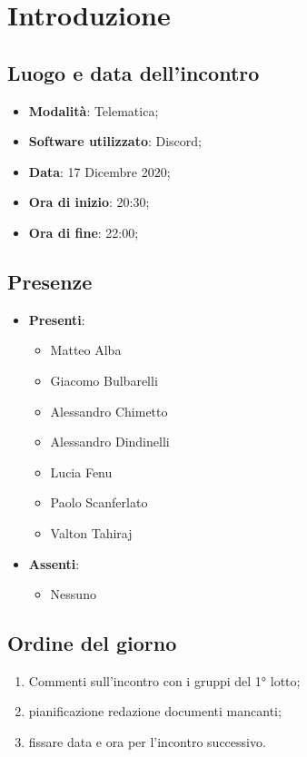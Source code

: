 \documentclass[]{article}
\begin{document}
	

	\newpage


	\section{Introduzione}
		\subsection{Luogo e data dell'incontro}
		\begin{itemize}
			\item \textbf{Modalità}: Telematica;
			\item \textbf{Software utilizzato}: Discord;
			\item \textbf{Data}: 17 Dicembre 2020;
			\item \textbf{Ora di inizio}: 20:30;
			\item \textbf{Ora di fine}: 22:00;
		\end{itemize}

		\subsection{Presenze}
		\begin{itemize}
			\item \textbf{Presenti}:
			\begin{itemize}
				\item Matteo Alba
				\item Giacomo Bulbarelli
				\item Alessandro Chimetto
				\item Alessandro Dindinelli
				\item Lucia Fenu
				\item Paolo Scanferlato
				\item Valton Tahiraj
			\end{itemize}
			\item \textbf{Assenti}:
			\begin{itemize}
				\item Nessuno
			\end{itemize}
		\end{itemize}


		\subsection{Ordine del giorno}
		\begin{enumerate}
			\item Commenti sull'incontro con i gruppi del 1° lotto;
			\item pianificazione redazione documenti mancanti;
			\item fissare data e ora per l'incontro successivo.
		\end{enumerate}
\end{document}
